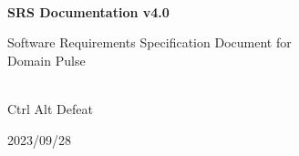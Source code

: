 \begin{titlepage}
    \centering



    \vspace{2cm}
    \hrulefill\\
    \vspace{1cm}
    {\Huge\bfseries SRS Documentation v4.0}

    \vspace{1cm}

    {\Large Software Requirements Specification Document for\\Domain Pulse}\\
    \vspace{1cm}
    \hrulefill\\

    \vfill

    {\large Ctrl Alt Defeat}

    \vspace{1cm}

    {\large 2023/09/28}\\

\end{titlepage}

